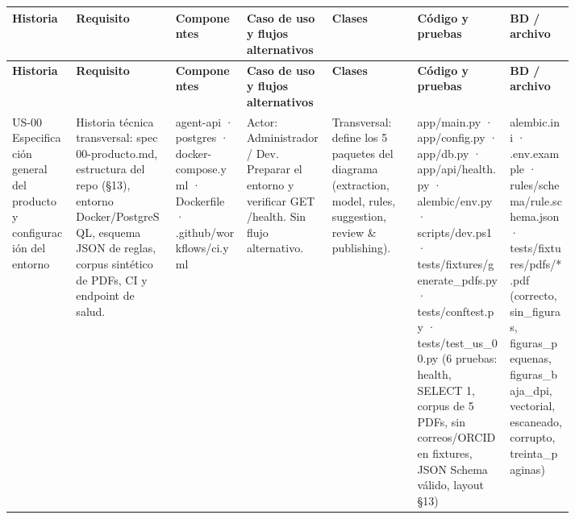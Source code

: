 \begin{landscape}
{\scriptsize
\begin{longtable}{@{}>{\raggedright\arraybackslash}p{0.091\linewidth}>{\raggedright\arraybackslash}p{0.147\linewidth}>{\raggedright\arraybackslash}p{0.100\linewidth}>{\raggedright\arraybackslash}p{0.120\linewidth}>{\raggedright\arraybackslash}p{0.121\linewidth}>{\raggedright\arraybackslash}p{0.136\linewidth}>{\raggedright\arraybackslash}p{0.099\linewidth}@{}}
\toprule
\textbf{Historia} & \textbf{Requisito} & \textbf{Componentes} & \textbf{Caso de uso y flujos alternativos} & \textbf{Clases} & \textbf{Código y pruebas} & \textbf{BD / archivo} \\
\midrule
\endfirsthead
\toprule
\textbf{Historia} & \textbf{Requisito} & \textbf{Componentes} & \textbf{Caso de uso y flujos alternativos} & \textbf{Clases} & \textbf{Código y pruebas} & \textbf{BD / archivo} \\
\midrule
\endhead
\bottomrule
\endfoot
\endlastfoot
US-00 Especificación general del producto y configuración del entorno & Historia técnica transversal: spec 00-producto.md, estructura del repo (§13), entorno Docker/PostgreSQL, esquema JSON de reglas, corpus sintético de PDFs, CI y endpoint de salud. & agent-api · postgres · docker-compose.yml · Dockerfile · .github/workflows/ci.yml & Actor: Administrador / Dev. Preparar el entorno y verificar GET /health. Sin flujo alternativo. & Transversal: define los 5 paquetes del diagrama (extraction, model, rules, suggestion, review \& publishing). & app/\allowbreak{}main.\allowbreak{}py · app/\allowbreak{}config.\allowbreak{}py · app/\allowbreak{}db.\allowbreak{}py · app/\allowbreak{}api/\allowbreak{}health.\allowbreak{}py · alembic/env.py · scripts/dev.ps1 · tests/\allowbreak{}fixtures/\allowbreak{}generate\_\allowbreak{}pdfs.\allowbreak{}py · tests/\allowbreak{}conftest.\allowbreak{}py · tests/\allowbreak{}test\_\allowbreak{}us\_\allowbreak{}00.\allowbreak{}py (6 pruebas: health, SELECT 1, corpus de 5 PDFs, sin correos/ORCID en fixtures, JSON Schema válido, layout §13) & alembic.ini · .env.example · rules/\allowbreak{}schema/\allowbreak{}rule.\allowbreak{}schema.\allowbreak{}json · tests/\allowbreak{}fixtures/\allowbreak{}pdfs/\allowbreak{}*.pdf (correcto, sin\_figuras, figuras\_pequenas, figuras\_baja\_dpi, vectorial, escaneado, corrupto, treinta\_paginas) \\

\end{longtable}}
\end{landscape}
